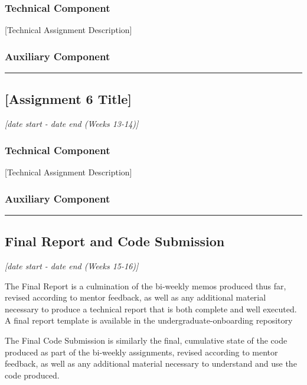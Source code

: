 \documentclass[12pt]{article}
\begin{document}
\subsubsection{Technical Component}
\label{sssec:a5t}

[Technical Assignment Description]


\subsubsection{Auxiliary Component}
\label{sssec:a5a}



\vspace{1em}\hrule\vspace{1em}
\subsection{[Assignment 6 Title]}
\label{ssec:a6}

\textit{[date start - date end (Weeks 13-14)]}


\subsubsection{Technical Component}
\label{sssec:a6t}

[Technical Assignment Description]


\subsubsection{Auxiliary Component}
\label{sssec:a6a}



\vspace{1em}\hrule\vspace{1em}
\subsection{Final Report and Code Submission}
\label{sec:finalreport}

\textit{[date start - date end (Weeks 15-16)]}

The Final Report is a culmination of the bi-weekly memos produced thus far, revised according to mentor feedback, as well as any additional material necessary to produce a technical report that is both complete and well executed.  A final report template is available in the undergraduate-onboarding repository

The Final Code Submission is similarly the final, cumulative state of the code produced as part of the bi-weekly assignments, revised according to mentor feedback, as well as any additional material necessary to understand and use the code produced.
\end{document}
